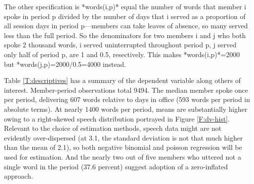 \documentclass[letter,12pt]{article}
\begin{document}
The other specification is *words(i,p)* equal the number of words that member i spoke in period p divided by the number of days that i served as a proportion of all session days in period p---members can take leaves of absence, so many served less than the full period. So the denominators for two members i and j who both spoke 2 thousand words, i served uninterrupted throughout period p, j served only half of period p, are 1 and 0.5, resectively. This makes *words(i,p)*=2000 but *words(j,p)=2000/0.5=4000 instead. 


Table \ref{T:descriptives} has a summary of the dependent variable along others of interest. Member-period observations total 9494. The median member spoke once per period, delivering 607 words relative to days in office (593 words per period in absolute terms). At nearly 1400 words per period, means are substantially higher owing to a right-skewed speech distribution portrayed in Figure \ref{F:dv-hist}. Relevant to the choice of estimation methods, speech data might are not evidently over-dispersed (at 3.1, the standard deviation is not that much higher than the mean of 2.1), so both negative binomial and poisson regression will be used for estimation. And the nearly two out of five members who uttered not a single word in the period (37.6 percent) suggest adoption of a zero-inflated approach.
\end{document}

